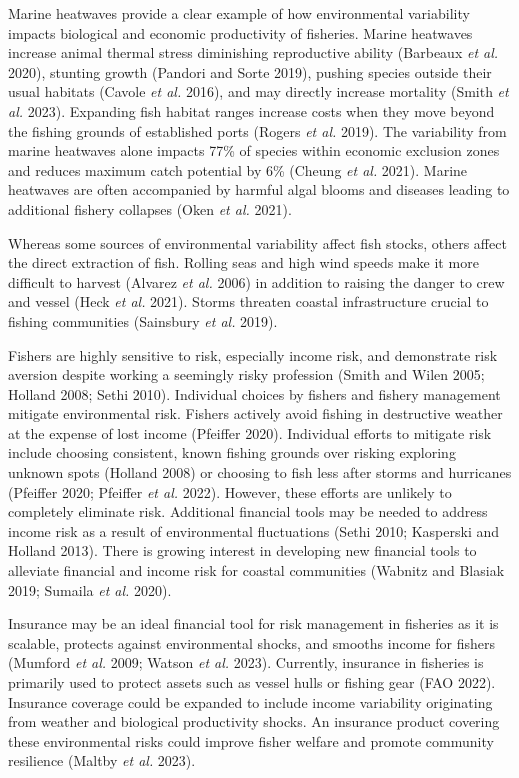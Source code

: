 \documentclass[
  letterpaper,
  DIV=11,
  numbers=noendperiod]{scrartcl}
\theoremstyle{plain}
\theoremstyle{plain}
\theoremstyle{remark}
\begin{document}
Marine heatwaves provide a clear example of how environmental
variability impacts biological and economic productivity of fisheries.
Marine heatwaves increase animal thermal stress diminishing reproductive
ability (Barbeaux \emph{et al.} 2020), stunting growth (Pandori and
Sorte 2019), pushing species outside their usual habitats (Cavole
\emph{et al.} 2016), and may directly increase mortality (Smith \emph{et
al.} 2023). Expanding fish habitat ranges increase costs when they move
beyond the fishing grounds of established ports (Rogers \emph{et al.}
2019). The variability from marine heatwaves alone impacts 77\% of
species within economic exclusion zones and reduces maximum catch
potential by 6\% (Cheung \emph{et al.} 2021). Marine heatwaves are often
accompanied by harmful algal blooms and diseases leading to additional
fishery collapses (Oken \emph{et al.} 2021).

Whereas some sources of environmental variability affect fish stocks,
others affect the direct extraction of fish. Rolling seas and high wind
speeds make it more difficult to harvest (Alvarez \emph{et al.} 2006) in
addition to raising the danger to crew and vessel (Heck \emph{et al.}
2021). Storms threaten coastal infrastructure crucial to fishing
communities (Sainsbury \emph{et al.} 2019).

Fishers are highly sensitive to risk, especially income risk, and
demonstrate risk aversion despite working a seemingly risky profession
(Smith and Wilen 2005; Holland 2008; Sethi 2010). Individual choices by
fishers and fishery management mitigate environmental risk. Fishers
actively avoid fishing in destructive weather at the expense of lost
income (Pfeiffer 2020). Individual efforts to mitigate risk include
choosing consistent, known fishing grounds over risking exploring
unknown spots (Holland 2008) or choosing to fish less after storms and
hurricanes (Pfeiffer 2020; Pfeiffer \emph{et al.} 2022). However, these
efforts are unlikely to completely eliminate risk. Additional financial
tools may be needed to address income risk as a result of environmental
fluctuations (Sethi 2010; Kasperski and Holland 2013). There is growing
interest in developing new financial tools to alleviate financial and
income risk for coastal communities (Wabnitz and Blasiak 2019; Sumaila
\emph{et al.} 2020).

Insurance may be an ideal financial tool for risk management in
fisheries as it is scalable, protects against environmental shocks, and
smooths income for fishers (Mumford \emph{et al.} 2009; Watson \emph{et
al.} 2023). Currently, insurance in fisheries is primarily used to
protect assets such as vessel hulls or fishing gear (FAO 2022).
Insurance coverage could be expanded to include income variability
originating from weather and biological productivity shocks. An
insurance product covering these environmental risks could improve
fisher welfare and promote community resilience (Maltby \emph{et al.}
2023).
\end{document}
